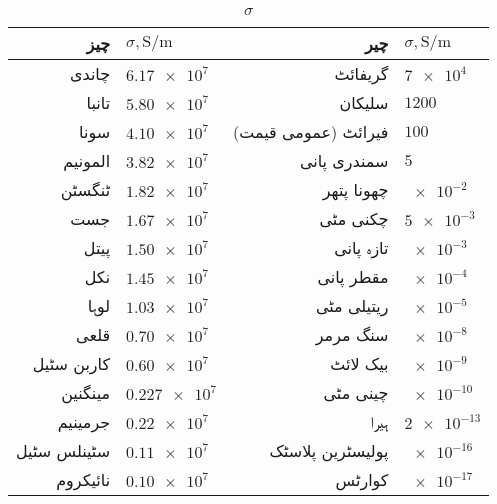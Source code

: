 {\renewcommand{\arraystretch}{1.2}
\begin{table}
\caption{$\sigma$}
\centering
\begin{tabular}{r | l || r | l}
\hline 
چیز & $\sigma, \si{\siemens \per \meter}$ & چیر & $\sigma, \si{\siemens \per \meter}$\\
\hline
چاندی &$\num{6.17e7}$ &گریفائٹ & $\num{7e4}$\\
تانبا & $\num{5.80e7}$&سلیکان & $\num{1200}$\\
سونا & $\num{4.10e7}$&فیرائٹ (عمومی قیمت) &$\num{100}$ \\
المونیم &$\num{3.82e7}$ &سمندری پانی &$\num{5}$ \\
ٹنگسٹن &$\num{1.82e7}$ &چھونا پتھر &$\num{e-2}$ \\
جست & $\num{1.67e7}$& چکنی مٹی&$\num{5e-3}$ \\
پیتل &$\num{1.50e7}$ & تازہ پانی&$\num{e-3}$ \\
نکل &$\num{1.45e7}$ & مقطر پانی& $\num{e-4}$\\
لوہا &$\num{1.03e7}$ & ریتیلی مٹی & $\num{e-5}$\\
قلعی &$\num{0.70e7}$ &سنگ مرمر &$\num{e-8}$ \\
کاربن سٹیل & $\num{0.60e7}$& بیک لائٹ & $\num{e-9}$\\
مینگنین & $\num{0.227e7}$ & چینی مٹی &$\num{e-10}$ \\
جرمینیم & $\num{0.22e7}$& ہیرا&$\num{2e-13}$ \\
سٹینلس سٹیل &$\num{0.11e7}$ &پولیسٹرین پلاسٹک &$\num{e-16}$ \\
نائیکروم & $\num{0.10e7}$&کوارٹس &$\num{e-17}$ \\
\end{tabular}
\label{جدول_جدول_موصلیت_کے_مستقل}
\end{table}
}
